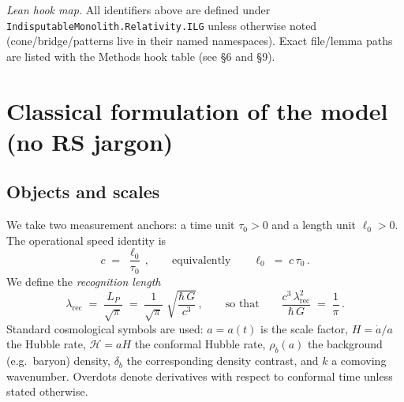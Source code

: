 \documentclass[12pt,a4paper]{article}
\begin{document}
\medskip
\noindent\emph{Lean hook map.} All identifiers above are defined under \texttt{IndisputableMonolith.\-Relativity.\-ILG} unless otherwise noted (cone/bridge/patterns live in their named namespaces). Exact file/lemma paths are listed with the Methods hook table (see §6 and §9).

\section{Classical formulation of the model (no RS jargon)}

\subsection{Objects and scales}
We take two measurement anchors: a time unit \(\tau_0>0\) and a length unit \(\ell_0>0\). The operational speed identity is
\begin{equation}
  c \;=\; \frac{\ell_0}{\tau_0}\,,
  \qquad\text{equivalently}\qquad
  \ell_0 \;=\; c\,\tau_0\,.
  \label{eq:speed-from-units}
\end{equation}
We define the \emph{recognition length}
\begin{equation}
  \lambda_{\mathrm{rec}} \;=\; \frac{L_P}{\sqrt{\pi}}
  \;=\;
  \frac{1}{\sqrt{\pi}}\;\sqrt{\frac{\hbar\,G}{c^3}}\,,
  \qquad\text{so that}\qquad
  \frac{c^3\,\lambda_{\mathrm{rec}}^2}{\hbar\,G} \;=\; \frac{1}{\pi}\,.
  \label{eq:planck-normalization}
\end{equation}
Standard cosmological symbols are used: \(a=a(t)\) is the scale factor, \(H=\dot a/a\) the Hubble rate, \(\mathcal{H}=aH\) the conformal Hubble rate, \(\rho_b(a)\) the background (e.g.\ baryon) density, \(\delta_b\) the corresponding density contrast, and \(k\) a comoving wavenumber. Overdots denote derivatives with respect to conformal time unless stated otherwise.
\end{document}
